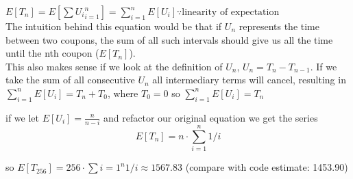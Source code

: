 \documentclass[solution,letterpaper]{cs20}
\begin{document}
\begin{problem}
\begin{solution}
$E[T_n] = E[\sum{U_i}_{i=1}^{n}] = \sum_{i=1}^{n}{E[U_i]} \because \text{linearity of expectation}$ \\
The intuition behind this equation would be that if $U_n$ represents the time between two coupons, the sum of all such intervals should give us all the time until the nth coupon ($E[T_n]$). \\

This also makes sense if we look at the definition of $U_n$, $U_n = T_n - T_{n-1}$. If we take the sum of all consecutive $U_n$ all intermediary terms will cancel, resulting in $\sum_{i=1}^{n}{E[U_i]} = T_n + T_0$, where $T_0 = 0$ so $\sum_{i=1}^{n}{E[U_i]} = T_n$

if we let $E[U_i] = \frac{n}{n-i}$ and refactor our original equation we get the series \\
\[
E[T_n] = n\cdot\sum_{i=1}^{n}{1/i}
\]

so $E[T_{256}] = 256\cdot\sum{i=1}^{n}{1/i} \approx 1567.83$ (compare with code estimate: 1453.90)


\end{solution}
\end{problem}
\end{document}
